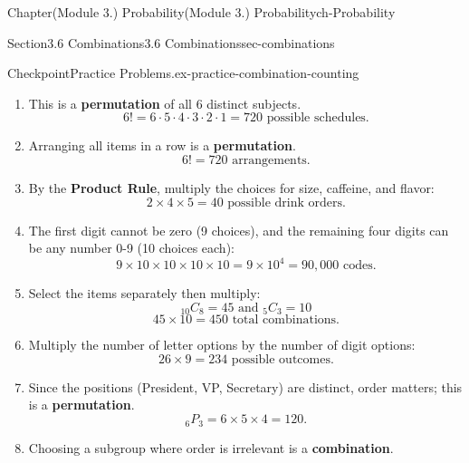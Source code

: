 \documentclass[oneside,10pt,]{book}
\newcommand{\terminology}[1]{\textbf{#1}}
\begin{document}
\begin{chapterptx}{Chapter}{(Module 3.) Probability}{}{(Module 3.) Probability}{}{}{ch-Probability}
\begin{sectionptx}{Section}{3.6 Combinations}{}{3.6 Combinations}{}{}{sec-combinations}
\begin{inlineexercise}{Checkpoint}{Practice Problems.}{ex-practice-combination-counting}
\begin{enumerate}
\begin{equation*}
{}_8 C_3 = \frac{8!}{3!(8-3)!} = \frac{8 \cdot 7 \cdot 6}{3 \cdot 2 \cdot 1} = 56.
\end{equation*}
%
\item{}This is a \terminology{permutation} of all 6 distinct subjects.%
\begin{equation*}
6! = 6 \cdot 5 \cdot 4 \cdot 3 \cdot 2 \cdot 1 = 720 \text{ possible schedules.}
\end{equation*}
%
\item{}Arranging all items in a row is a \terminology{permutation}.%
\begin{equation*}
6! = 720 \text{ arrangements.}
\end{equation*}
%
\item{}By the \terminology{Product Rule}, multiply the choices for size, caffeine, and flavor:%
\begin{equation*}
2 \times 4 \times 5 = 40 \text{ possible drink orders.}
\end{equation*}
%
\item{}The first digit cannot be zero (9 choices), and the remaining four digits can be any number 0-9 (10 choices each):%
\begin{equation*}
9 \times 10 \times 10 \times 10 \times 10= 9 \times 10^4 = 90{,}000 \text{ codes.}
\end{equation*}
%
\item{}Select the items separately then multiply:%
\begin{equation*}
{}_{10} C_8 = 45 \text{ and } {}_5 C_3 = 10
\end{equation*}
%
\begin{equation*}
45 \times 10 = 450 \text{ total combinations.}
\end{equation*}
%
\item{}Multiply the number of letter options by the number of digit options:%
\begin{equation*}
26 \times 9 = 234 \text{ possible outcomes.}
\end{equation*}
%
\item{}Since the positions (President, VP, Secretary) are distinct, order matters; this is a \terminology{permutation}.%
\begin{equation*}
{}_6 P_3 = 6 \times 5 \times 4 = 120.
\end{equation*}
%
\item{}Choosing a subgroup where order is irrelevant is a \terminology{combination}.%
\begin{equation*}

\end{equation*}
\end{enumerate}
\end{inlineexercise}
\end{sectionptx}
\end{chapterptx}
\end{document}
